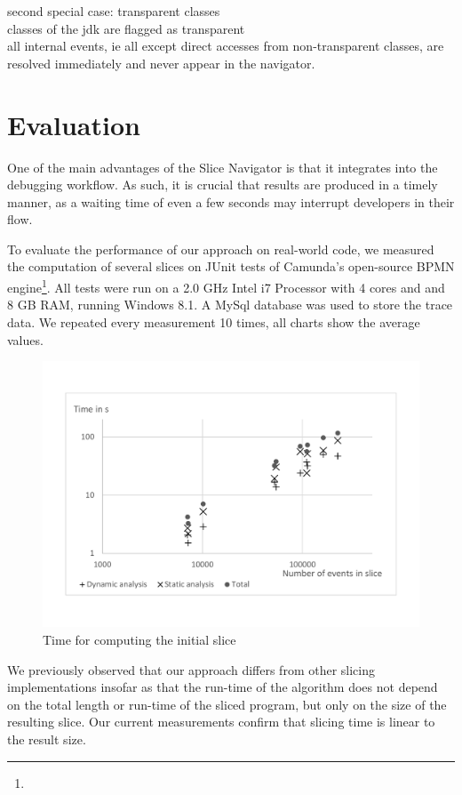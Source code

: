 ﻿\documentclass[
      english,
			conference,
      ]{IEEEtran}
\newcommand{\todo}[2][]{\pdfmargincomment[color=orange,icon=Note,subject={TODO},author={#1}]{#2}}
\begin{document}
second special case: transparent classes\\
classes of the jdk are flagged as transparent\\
all internal events, ie all except direct accesses from non-transparent classes, are resolved immediately and never appear in the navigator.

\section{Evaluation}
\label{sec:eval}

One of the main advantages of the Slice Navigator is that it integrates into the debugging workflow.
As such, it is crucial that results are produced in a timely manner, as a waiting time of even a few seconds may interrupt developers in their flow.

To evaluate the performance of our approach on real-world code, we measured the computation of several slices on JUnit tests of Camunda's open-source BPMN engine\footnote{\todo{link to camunda}}.
All tests were run on a 2.0 GHz Intel i7 Processor with 4 cores and and 8 GB RAM, running Windows 8.1.
A MySql database was used to store the trace data.
We repeated every measurement 10 times, all charts show the average values.

\begin{figure}
	\centering
		\includegraphics[width=\linewidth, clip, trim={20mm 26mm 20mm 26mm}]{chart-initial.pdf}
	\caption{Time for computing the initial slice}
	\label{fig:chartinitial}
\end{figure}

We previously observed that our approach differs from other slicing implementations insofar as that the run-time of the algorithm does not depend on the total length or run-time of the sliced program, but only on the size of the resulting slice\todo{cite}.
Our current measurements confirm that slicing time is linear to the result size.
\end{document}
